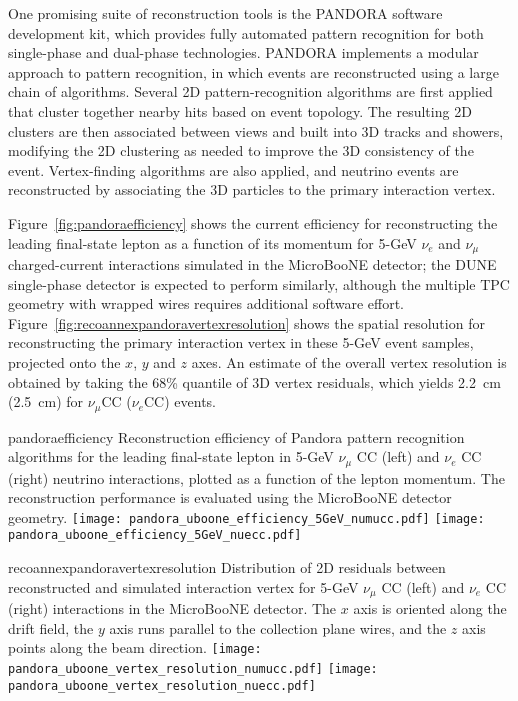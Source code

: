 One promising suite of reconstruction tools is the PANDORA software
development kit\cite{Marshall:2013bda,Marshall:2012hh}, which provides
fully automated pattern recognition for both single-phase and
dual-phase technologies.  PANDORA implements a modular approach to
pattern recognition, in which events are reconstructed using a large
chain of algorithms.  Several 2D pattern-recognition algorithms are
first applied that cluster together nearby hits based on event
topology.  The resulting 2D clusters are then associated between views
and built into 3D tracks and showers, modifying the 2D clustering as
needed to improve the 3D consistency of the event.  Vertex-finding
algorithms are also applied, and neutrino events are reconstructed by
associating the 3D particles to the primary interaction vertex.

Figure~\ref{fig:pandoraefficiency} shows the current efficiency for
reconstructing the leading final-state lepton as a function of its
momentum for 5-GeV $\nu_{e}$ and $\nu_{\mu}$ charged-current
interactions simulated in the MicroBooNE detector; the DUNE
single-phase detector is expected to perform similarly, although the
multiple TPC geometry with wrapped wires requires additional software
effort.
Figure~\ref{fig:recoannexpandoravertexresolution} shows the spatial
resolution for reconstructing the primary interaction vertex in these
5-GeV event samples, projected onto the $x$, $y$ and $z$ axes. An
estimate of the overall vertex resolution is obtained by taking the
68\% quantile of 3D vertex residuals, which yields 2.2~cm (2.5~cm)
for $\nu_{\mu}$CC ($\nu_{e}$CC) events.
\begin{cdrfigure}{pandoraefficiency}
{Reconstruction efficiency of Pandora pattern recognition algorithms
 for the leading final-state lepton in 5-GeV $\nu_{\mu}$ CC (left) and
 $\nu_{e}$ CC (right) neutrino interactions, plotted as a function of
 the lepton momentum. The reconstruction performance is evaluated
 using the MicroBooNE detector geometry. }
\texttt{[image: pandora\_uboone\_efficiency\_5GeV\_numucc.pdf]}
\texttt{[image: pandora\_uboone\_efficiency\_5GeV\_nuecc.pdf]}
\end{cdrfigure}
\begin{cdrfigure}{recoannexpandoravertexresolution}
{Distribution of 2D residuals between reconstructed and simulated interaction
 vertex for 5-GeV $\nu_{\mu}$ CC (left) and $\nu_{e}$ CC (right) interactions in the MicroBooNE detector.
 The $x$ axis is oriented along the drift field, the $y$ axis runs parallel 
 to the collection plane wires, and the $z$ axis points along the beam direction.}
\texttt{[image: pandora\_uboone\_vertex\_resolution\_numucc.pdf]}
\texttt{[image: pandora\_uboone\_vertex\_resolution\_nuecc.pdf]}
\end{cdrfigure}

